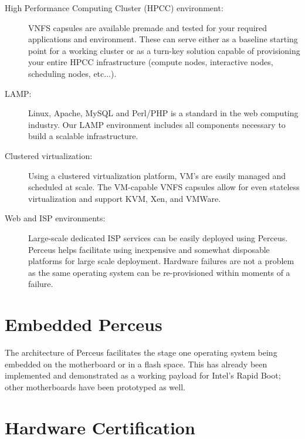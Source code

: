 \documentclass[10pt,letterpaper]{report}
\begin{document}
\begin{description}

\item[High Performance Computing Cluster (HPCC) environment:]  VNFS
capsules are available premade and tested for your required applications and
environment.  These can serve either as a baseline starting point for a
working cluster or as a turn-key solution capable of provisioning your entire
HPCC infrastructure (compute nodes, interactive nodes, scheduling nodes,
etc...).

\item[LAMP:]  Linux, Apache, MySQL and Perl/PHP is a standard in the web
computing industry.  Our LAMP environment includes all components necessary to
build a scalable infrastructure.

\item[Clustered virtualization:]  Using a clustered virtualization platform,
VM's are easily managed and scheduled at scale.  The VM-capable VNFS capsules
allow for even stateless virtualization and support KVM, Xen, and VMWare.

\item[Web and ISP environments:]  Large-scale dedicated ISP services can be
easily deployed using Perceus.  Perceus helps facilitate using inexpensive and
somewhat disposable platforms for large scale deployment.  Hardware failures
are not a problem as the same operating system can be re-provisioned within
moments of a failure.

\end{description}


\section{Embedded Perceus}

The architecture of Perceus facilitates the stage one operating system being
embedded on the motherboard or in a flash space.  This has already been
implemented and demonstrated as a working payload for Intel's Rapid Boot;
other motherboards have been prototyped as well.

\section{Hardware Certification}
\end{document}

